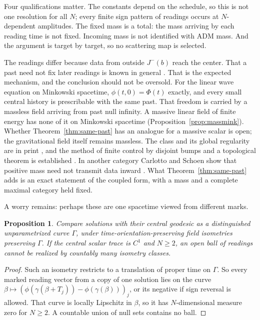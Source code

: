 \documentclass[11pt]{article}
\newtheorem{proposition}[theorem]{Proposition}
\theoremstyle{definition}
\newcommand{\Jm}{J^{-}}
\begin{document}
Four qualifications matter. The constants depend on the schedule, so this is not one resolution for
all $N$; every finite sign pattern of readings occurs at $N$-dependent amplitudes. The fixed mass is
a total: the mass arriving by each reading time is not fixed. Incoming mass is not identified with
ADM mass. And the argument is target by target, so no scattering map is selected.

The readings differ because data from outside $\Jm(b)$ reach the center. That a past need not fix later readings is known in general \citep{Geroch1977,Manchak2008}. That is the expected mechanism, and the conclusion should not be oversold. For the linear wave equation on Minkowski
spacetime, $\phi(t,0)=\Phi(t)$ exactly, and every small central history is prescribable with the same
past. That freedom is carried by a massless field arriving from past null infinity. A massive linear field of finite energy has none of it on Minkowski spacetime (Proposition~\ref{prop:massmink}). Whether Theorem~\ref{thm:same-past} has an analogue for a massive scalar is open; the gravitational field itself remains massless. The class and its global regularity are in print \citep{Kehrberger2021}, and the method of
finite control by disjoint bumps and a topological theorem is established \citep{KehleUnger2022}. In
another category Carlotto and Schoen show that positive mass need not transmit data inward
\citep{CarlottoSchoen2016}. What Theorem~\ref{thm:same-past} adds is an exact statement of the
coupled form, with a mass and a complete maximal category held fixed.

A worry remains: perhaps these are one spacetime viewed from different marks.

\begin{proposition}\label{prop:uncountable}
Compare solutions with their central geodesic as a distinguished unparametrized curve $\Gamma$,
under time-orientation-preserving field isometries preserving $\Gamma$. If the central scalar trace is
$C^1$ and $N\ge2$, an open ball of readings cannot be realized by countably many isometry classes.
\end{proposition}

\begin{proof}
Such an isometry restricts to a translation of proper time on $\Gamma$. So every marked reading vector
from a copy of one solution lies on the curve $\beta\mapsto
(\phi(\gamma(\beta+T_j))-\phi(\gamma(\beta)))_j$, or its negative if sign reversal is allowed. That curve
is locally Lipschitz in $\beta$, so it has $N$-dimensional measure zero for $N\ge2$. A countable union
of null sets contains no ball.
\end{proof}
\end{document}
